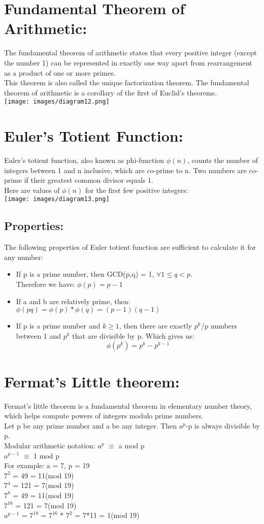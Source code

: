 \documentclass{article}
\begin{document}
\section{Fundamental Theorem of Arithmetic:}
The fundamental theorem of arithmetic states that every positive integer (except the number 1) can be represented in exactly one way apart from rearrangement as a product of one or more primes.\\
This theorem is also called the unique factorization theorem. The fundamental theorem of arithmetic is a corollary of the first of Euclid's theorems.\\
\texttt{[image: images/diagram12.png]}
\section{Euler’s Totient Function:}
Euler's totient function, also known as phi-function $\phi(n)$, counts the number of
integers between 1 and n inclusive, which are co-prime to n. Two numbers are co-prime if
their greatest common divisor equals 1.\\
Here are values of $\phi(n)$ for the first few positive integers:\\
\texttt{[image: images/diagram13.png]}
\subsection{Properties:}
The following properties of Euler totient function are sufficient to calculate it for any number:
\begin{itemize}
    \item If p is a prime number, then GCD(p,q) = 1, $\forall 1 \leq q < p $.
    \\Therefore we have: $\phi(p)=p-1$
    \item If a and b are relatively prime, then: 
    \\ $\phi(pq)= \phi(p) * \phi(q) = (p-1)(q-1) $
    \item If p is a prime number and $k\geq 1$, then there are exactly $p^{k}$/p numbers between 1 and $p^{k}$ that are divisible by p. Which gives us: 
    $$ \phi(p^{k})=p^{k}-p^{k-1}$$
\end{itemize}
\section{Fermat's Little theorem:}
Fermat's little theorem is a fundamental theorem in elementary number theory, which helps compute powers of integers modulo prime numbers.
\\ Let p be any prime number and a be any integer. Then $a^{p}$-p is always divisible by p. \\
Modular arithmetic notation: $a^{p}$ $\equiv$ a mod p \\
$a^{p-1}$ $\equiv$ 1 mod p \\
For example: a = 7, p = 19 \\
$7^{2}$ = 49 = 11(mod 19)\\
$7^{4}$ = 121 = 7(mod 19)\\
$7^{8}$ = 49 = 11(mod 19)\\
$7^{16}$ = 121 = 7(mod 19)\\
$a^{p-1}$ = $7^{18}$ = $7^{16}$ * $7^{2}$ = 7*11 = 1(mod 19)
\end{document}
